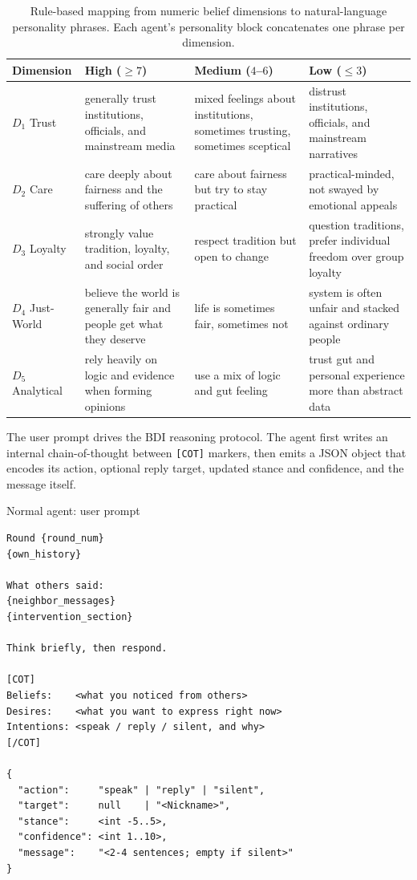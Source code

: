 \begin{table}[!htbp]
\centering
\small
\renewcommand{\arraystretch}{1.15}
\caption{Rule-based mapping from numeric belief dimensions to natural-language personality phrases. Each agent's personality block concatenates one phrase per dimension.}
\label{tab:personality_mapping}
\setlength{\tabcolsep}{4pt}
\begin{tabular}{@{}l p{} p{} p{}@{}}
\toprule
\textbf{Dimension} & \textbf{High ($\geq 7$)} & \textbf{Medium ($4$--$6$)} & \textbf{Low ($\leq 3$)} \\
\midrule
$D_1$ Trust & generally trust institutions, officials, and mainstream media & mixed feelings about institutions, sometimes trusting, sometimes sceptical & distrust institutions, officials, and mainstream narratives \\
$D_2$ Care & care deeply about fairness and the suffering of others & care about fairness but try to stay practical & practical-minded, not swayed by emotional appeals \\
$D_3$ Loyalty & strongly value tradition, loyalty, and social order & respect tradition but open to change & question traditions, prefer individual freedom over group loyalty \\
$D_4$ Just-World & believe the world is generally fair and people get what they deserve & life is sometimes fair, sometimes not & system is often unfair and stacked against ordinary people \\
$D_5$ Analytical & rely heavily on logic and evidence when forming opinions & use a mix of logic and gut feeling & trust gut and personal experience more than abstract data \\
\bottomrule
\end{tabular}
\end{table}

The user prompt drives the BDI reasoning protocol. The agent first writes an internal chain-of-thought between \texttt{[COT]} markers, then emits a JSON object that encodes its action, optional reply target, updated stance and confidence, and the message itself.

\begin{npromptbox}{Normal agent: user prompt}
\begin{verbatim}
Round {round_num}
{own_history}

What others said:
{neighbor_messages}
{intervention_section}

Think briefly, then respond.

[COT]
Beliefs:    <what you noticed from others>
Desires:    <what you want to express right now>
Intentions: <speak / reply / silent, and why>
[/COT]

{
  "action":     "speak" | "reply" | "silent",
  "target":     null    | "<Nickname>",
  "stance":     <int -5..5>,
  "confidence": <int 1..10>,
  "message":    "<2-4 sentences; empty if silent>"
}
\end{verbatim}
\end{npromptbox}

